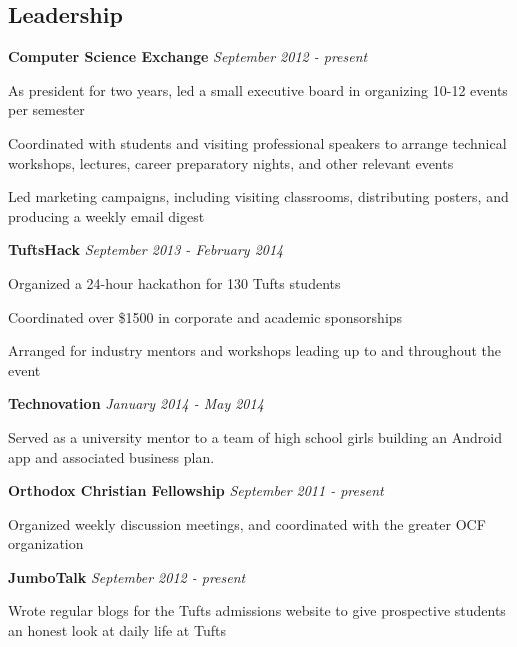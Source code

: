\documentclass{article}
\newenvironment{achievements}{
  \begin{compactitem} }{
  \end{compactitem}
}
\newcommand{\hack}[3]{
  \textbf{#1} \hfill \textit{#2} #3
  \smallskip
}
\begin{document}
\subsection*{Leadership}
\hack{Computer Science Exchange}{September 2012 - present}
{
  \begin{achievements}
  \item As president for two years, led a small executive board in organizing
  10-12 events per semester
  \item Coordinated with students and visiting professional speakers to arrange
  technical workshops, lectures, career preparatory nights, and other relevant
  events
  \item Led marketing campaigns, including visiting classrooms, distributing
  posters, and producing a weekly email digest
  \end{achievements}
}
\hack{TuftsHack}{September 2013 - February 2014}
{
  \begin{achievements}
  \item Organized a 24-hour hackathon for 130 Tufts students
  \item Coordinated over \$1500 in corporate and academic sponsorships 
  \item Arranged for industry mentors and workshops leading up to and throughout
  the event
  \end{achievements}
}
\hack{Technovation}{January 2014 - May 2014}
{
  \begin{achievements}
  \item Served as a university mentor to a team of high school girls building an
  Android app and associated business plan.
  \end{achievements}
}
\hack{Orthodox Christian Fellowship}{September 2011 - present}
{
  \begin{achievements}
  \item
  Organized weekly discussion meetings, and coordinated with the greater OCF organization 
  \end{achievements}
} 
\hack{JumboTalk}{September 2012 - present}
{
  \begin{achievements}
  \item Wrote regular blogs for the Tufts admissions website to give prospective
  students an honest look at daily life at Tufts 
  \end{achievements}
}
\end{document}
